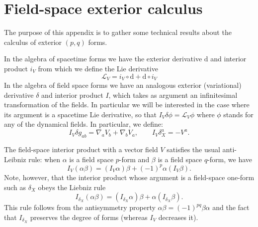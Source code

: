 \documentclass[a4paper,11pt]{article}
\def\rd{\mathrm{d}}
\begin{document}



\appendix

\section{Field-space exterior calculus} \label{appendix:exterior}

The purpose of this appendix is to gather some technical results about the calculus of exterior $(p,q)$ forms.

In the algebra of spacetime forms we have the exterior derivative $\rd$ and interior product $i_V$ from which we define the Lie derivative
\begin{equation}
\mathcal{L}_V = i_V \circ \rd + \rd \circ i_V
\end{equation}
In the algebra of field space forms we have an analogous exterior (variational) derivative $\delta$ and interior product $I$, which takes as argument an infinitesimal transformation of the fields.
In particular we will be interested in the case where its argument is a spacetime Lie derivative, so that $I_V \delta \phi = \mathcal{L}_V \phi$ where $\phi$ stands for any of the dynamical fields.
In particular, we define:
\begin{equation}
I_V \delta g_{ab} = \nabla_a V_b + \nabla_b V_a, \qquad I_V \delta_X^a = -V^a.
\end{equation}

The field-space interior product with a vector field $V$ satisfies the usual anti-Leibniz rule: when $\alpha$ is a field space $p$-form and $\beta$ is a field space $q$-form, we have
\begin{equation}
I_V (\alpha \beta) = (I_V \alpha) \beta + (-1)^p \alpha (I_V \beta).
\end{equation}
Note, however, that the interior product whose argument is a field-space one-form such as $\delta_X$  obeys the Liebniz rule
\begin{equation}
I_{\delta_X} (\alpha \beta) = (I_{\delta_X} \alpha) \beta + \alpha (I_{\delta_X} \beta).
\end{equation}
This rule follows from the antisymmetry property $\alpha \beta = (-1)^{pq} \beta \alpha$ and the fact that $I_{\delta_X}$ preserves the degree of forms (whereas $I_V$ decreases it).
\end{document}
